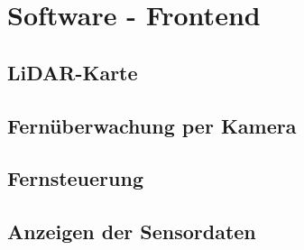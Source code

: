 
\section{Software - Frontend}
\label{sec:software_frontend}

\subsection{LiDAR-Karte}
\label{subsec:frontend_lidar_map}

\subsection{Fernüberwachung per Kamera}
\label{subsec:frontend_cam_stream}

\subsection{Fernsteuerung}
\label{subsec_frontend_control}

\subsection{Anzeigen der Sensordaten}
\label{subsec:frontend_sensors}
